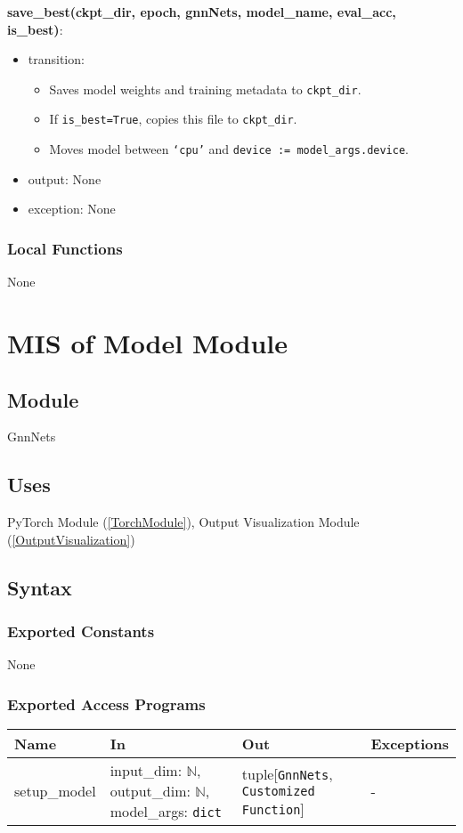 \documentclass[12pt, titlepage]{article}
\begin{document}
\noindent \textbf{save\_best(ckpt\_dir, epoch, gnnNets, model\_name, eval\_acc, is\_best)}:
\begin{itemize}
  \item transition:
  \begin{itemize}
    \item Saves model weights and training metadata to \texttt{ckpt\_dir}.
    \item If \texttt{is\_best=True}, copies this file to \texttt{ckpt\_dir}.
    \item Moves model between \texttt{`cpu'} and \texttt{device := model\_args.device}.
  \end{itemize}
  \item output: None
  \item exception: None
\end{itemize}

\subsubsection{Local Functions}
None




\newpage




\section{MIS of Model Module} \label{Model}

\subsection{Module}
GnnNets

\subsection{Uses}
PyTorch Module (\ref{TorchModule}), Output Visualization Module (\ref{OutputVisualization})

\subsection{Syntax}

\subsubsection{Exported Constants}
None

\subsubsection{Exported Access Programs}
\begin{center}
\begin{tabular}{p{3.2cm} p{6cm} p{4cm} p{3cm}}
\hline
\textbf{Name} & \textbf{In} & \textbf{Out} & \textbf{Exceptions} \\
\hline
setup\_model & input\_dim: \(\mathbb{N}\), output\_dim: \(\mathbb{N}\), model\_args: \texttt{dict} & tuple[\texttt{GnnNets}, \texttt{Customized Function}] & - \\
\hline
\end{tabular}
\end{center}
\end{document}
